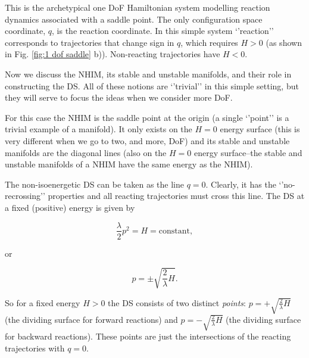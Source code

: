 \documentclass{article}
\begin{document}
This is the archetypical one DoF Hamiltonian system modelling reaction dynamics associated with a saddle point. The only configuration space coordinate, $q$, is the reaction coordinate. 
In this simple system `'reaction'' corresponds to trajectories that change sign in $q$, which requires $H>0$ (as shown in Fig. \ref{fig:1 dof saddle} b)). Non-reacting trajectories have $H <0$. 

Now we discuss the NHIM, its stable and unstable manifolds, and their role in constructing the DS. All of these notions are `'trivial'' in this simple setting, but they will serve  to focus the ideas when we consider more DoF. 

For this case the NHIM  is the saddle point at the origin (a single `'point'' is a trivial example of a manifold). It only exists  on the $H=0$ energy surface (this is  very different when we go to two, and more, DoF) and its stable and unstable manifolds are the diagonal lines (also on the $H=0$ energy surface--the stable and unstable manifolds of a NHIM have the same energy as the NHIM). 

The non-isoenergetic DS can be taken as the line $q=0$. Clearly, it has the `'no-recrossing'' properties and all  reacting trajectories must cross this line. The DS at a fixed (positive) energy is  given by

\begin{equation}
\frac{\lambda}{2} p^2 = H = \mbox{constant},
\end{equation}

\noindent
or

\[
p =\pm \sqrt{\frac{2}{\lambda} H}.
\]


\noindent
So for a fixed energy $H > 0$ the DS consists of two distinct  {\em points}:  $p =+ \sqrt{\frac{2}{\lambda} H}$ (the dividing surface for forward reactions) and $p =- \sqrt{\frac{2}{\lambda} H}$ (the dividing surface for backward reactions).  These points are just the intersections of the reacting trajectories with $q=0$.
\end{document}

